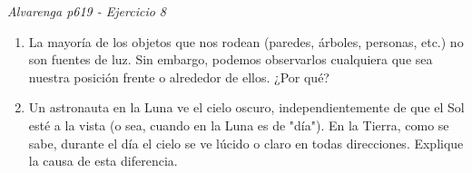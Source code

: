 \textit{Alvarenga p619 - Ejercicio 8}
\begin{enumerate}
    \item La mayoría de los objetos que nos rodean (paredes, árboles, personas, etc.) no son fuentes de luz. Sin embargo, podemos observarlos cualquiera que sea nuestra posición frente o alrededor de ellos. ¿Por qué?
    \item Un astronauta en la Luna ve el cielo oscuro, independientemente de que el Sol esté a la vista (o sea, cuando en la Luna es de "día"). En la Tierra, como se sabe, durante el día el cielo se ve lúcido o claro en todas direcciones. Explique la causa de esta diferencia.
\end{enumerate}